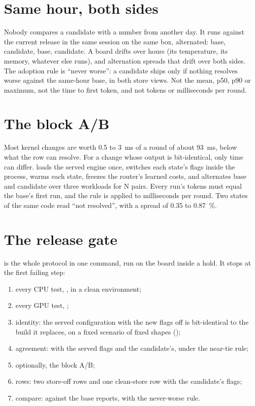 \section{Same hour, both sides}

Nobody compares a candidate with a number from another day. It runs against the current release in the same session on the same box, alternated: base, candidate, base, candidate. A board drifts over hours (its temperature, its memory, whatever else runs), and alternation spreads that drift over both sides. The adoption rule is \enquote{never worse}: a candidate ships only if nothing resolves worse against the same-hour base, in both store views. Not the mean, p50, p90 or maximum, not the time to first token, and not tokens or milliseconds per round.

\section{The block A/B}

Most kernel changes are worth 0.5 to 3~ms of a round of about 93~ms, below what the row can resolve. For a change whose output is bit-identical, only time can differ.  loads the served engine once, switches each state's flags inside the process, warms each state, freezes the router's learned costs, and alternates base and candidate over three workloads for N pairs. Every run's tokens must equal the base's first run, and the rule is applied to milliseconds per round. Two states of the same code read \enquote{not resolved}, with a spread of 0.35 to 0.87~\%.

\section{The release gate}

 is the whole protocol in one command, run on the board inside a hold. It stops at the first failing step:

\begin{enumerate}
\item every CPU test, , in a clean environment;
\item every GPU test, ;
\item identity: the served configuration with the new flags off is bit-identical to the build it replaces, on a fixed scenario of fixed shapes ();
\item agreement:  with the served flags and the candidate's, under the near-tie rule;
\item optionally, the block A/B;
\item rows: two store-off rows and one clean-store row with the candidate's flags;
\item compare:  against the base reports, with the never-worse rule.
\end{enumerate}

